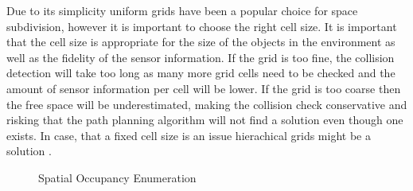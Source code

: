 Due to its simplicity uniform grids have been a popular choice for space subdivision, however it is important to choose the right cell size. It is important that the cell size is appropriate for the size of the objects in the environment as well as the fidelity of the sensor information. If the grid is too fine, the collision detection will take too long as many more grid cells need to be checked and the amount of sensor information per cell will be lower. If the grid is too coarse then the free space will be underestimated, making the collision check conservative and risking that the path planning algorithm will not find a solution even though one exists. In case, that a fixed cell size is an issue hierachical grids might be a solution \cite{Ericson.2005}.

\begin{figure}[h]
    \caption{Spatial Occupancy Enumeration}
    \label{fig:spatialOccupancyEnumeration}
\end{figure}